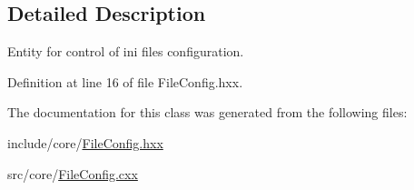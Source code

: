 \subsection{Detailed Description}
Entity for control of ini files configuration. 

Definition at line 16 of file File\+Config.\+hxx.



The documentation for this class was generated from the following files\+:\begin{DoxyCompactItemize}
\item 
include/core/\mbox{\hyperlink{_file_config_8hxx}{File\+Config.\+hxx}}\item 
src/core/\mbox{\hyperlink{_file_config_8cxx}{File\+Config.\+cxx}}\end{DoxyCompactItemize}
